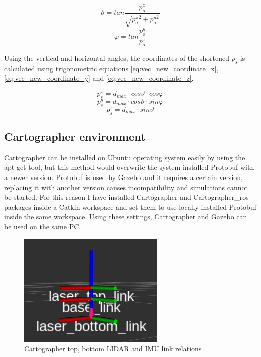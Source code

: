 \begin{equation} \label{eq:vec_elevation}
    \vartheta=tan\frac{p_{o}^{z}}{\sqrt{{p_{o}^{x}}^{2} + {p_{o}^{y}}^{2}}}
\end{equation}
\begin{equation} \label{eq:vec_horizontal}
    \varphi=tan\frac{p_{o}^{y}}{p_{o}^{x}}
\end{equation}

Using the vertical and horizontal angles, the coordinates of the shortened $p_{s}$ is calculated using 
trigonometric equations \ref{eq:vec_new_coordinate_x}, \ref{eq:vec_new_coordinate_y} 
and \ref{eq:vec_new_coordinate_z}.

\begin{equation} \label{eq:vec_new_coordinate_x}
    p_{s}^{x} = d_{max} \cdot cos\vartheta \cdot cos\varphi
\end{equation}
\begin{equation} \label{eq:vec_new_coordinate_y}
    p_{s}^{y} = d_{max} \cdot cos\vartheta \cdot sin\varphi
\end{equation}
\begin{equation} \label{eq:vec_new_coordinate_z}
    p_{s}^{z} = d_{max} \cdot  sin\vartheta
\end{equation}



\subsection{Cartographer environment} \label{sect:cartographer_environment}
Cartographer can be installed on Ubuntu operating system easily by using the apt-get tool, but this
method would overwrite the system installed Protobuf with a newer version. Protobuf is used by 
Gazebo and it requires a certain version, replacing it with another version causes incompatibility 
and simulations cannot be started. For this reason I have installed Cartographer and Cartographer\_ros
packages inside a Catkin workspace and set them to use locally installed Protobuf inside the same
workspace. Using these settings, Cartographer and Gazebo can be used on the same PC.

\begin{figure}[!ht]
    \centering
    \includegraphics[width=70mm, keepaspectratio]{figures/cartographer_tf_setup.png}
    \caption{Cartographer top, bottom LIDAR and IMU link relations}
    \label{fig:cartographer_tf_setup}
\end{figure}


